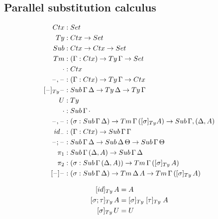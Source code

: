\documentclass[a4paper,UKenglish,numberwithinsect,cleveref,thm-restate]{lipics-v2021}
\begin{document}
\subsection{Parallel substitution calculus} \label{subsec:SC}
\begin{alignat*}{3}
  \Ctx   & : \Set                   \\
  \Ty    & : \Ctx \to \Set          \\
  \Sub   & : \Ctx \to \Ctx \to \Set \\
  \Tm    & : (\Gamma : \Ctx) \to \Ty\,\Gamma \to \Set \\
  \emptyctx & : \Ctx \\
  \blank,\blank & : (\Gamma : \Ctx) \to \Ty\,\Gamma \to \Ctx \\
  [\blank]_{\Ty}\blank &: \Sub\,\Gamma\,\Delta \to \Ty\,\Delta \to \Ty\,\Gamma \\
  U & : \Ty \\
  \emptysub & : \Sub\,\Gamma\,\emptyctx \\
  \blank,\blank & : (\sigma : \Sub\,\Gamma\,\Delta) \to \Tm\,\Gamma\,([ \sigma ]_{\Ty} A) \to \Sub\,\Gamma,(\Delta, A) \\
  \idS_{\blank} & : (\Gamma : \Ctx) \to \Sub\,\Gamma\,\Gamma \\
  \blank;\blank & : \Sub\,\Gamma\,\Delta \to \Sub\,\Delta\,\Theta \to \Sub\,\Gamma\,\Theta \\
  \pi_1 & : \Sub\,\Gamma\,(\Delta, A) \to \Sub\,\Gamma\,\Delta \\
  \pi_2 & : (\sigma : \Sub\,\Gamma\,(\Delta, A)) \to \Tm\,\Gamma\,([ \sigma ]_{\Ty}\, A) \\
  [\blank] \blank & : (\sigma : \Sub\,\Gamma\,\Delta) \to \Tm\,\Delta\,A \to \Tm\,\Gamma\,([\sigma]_{\Ty}\, A)
\end{alignat*}

\begin{alignat*}{3}
[ \idS ]_{\Ty}\,A          & = A \\
[ \sigma ; \tau ]_{\Ty}\,A & = [ \sigma ]_{\Ty}\;[ \tau ]_{\Ty}\;A \\
[ \sigma ]_{\Ty}\,U & = U
\end{alignat*}
\end{document}
